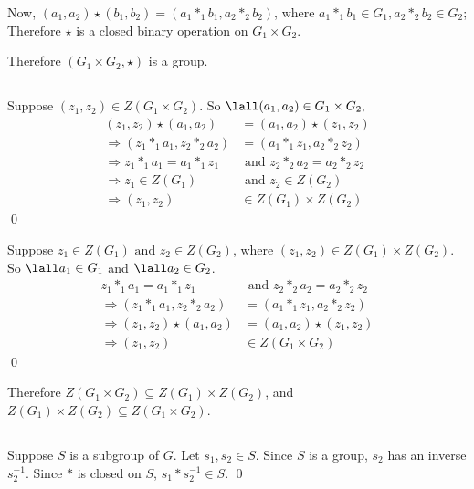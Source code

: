         Now, $(a_1, a_2) \star (b_1, b_2) = (a_1 *_1 b_1, a_2 *_2 b_2)$,
        where $a_1 *_1 b_1 \in G_1, a_2 *_2 b_2 \in G_2$;\\
        Therefore $\star$ is a closed binary operation on $G_1 \times G_2$.

        Therefore $(G_1\times G_2, \star)$ is a group.

    \subsection{
        }
        Suppose $(z_1, z_2) \in Z(G_1 \times G_2)$.
        So $\lall (a_1, a_2) \in G_1 \times G_2,$
        \begin{align*}
            (z_1 , z_2) \star (a_1,a_2) &= (a_1,a_2) \star (z_1, z_2) \\
            \Rightarrow (z_1 *_1 a_1, z_2 *_2 a_2) &= (a_1 *_1 z_1, a_2 *_2 z_2) \\
            \Rightarrow z_1 *_1 a_1 = a_1 *_1 z_1 &\text{ and } z_2 *_2 a_2 = a_2 *_2 z_2 \\
            \Rightarrow z_1 \in Z(G_1) &\text{ and } z_2 \in Z(G_2) \\
            \Rightarrow (z_1, z_2) &\in Z(G_1) \times Z(G_2)
        \end{align*} 
        \qed

        Suppose $z_1 \in Z(G_1) \text{ and } z_2 \in Z(G_2)$, 
        where $(z_1, z_2) \in Z(G_1) \times Z(G_2)$.
        So $\lall a_1 \in G_1$ and $\lall a_2 \in G_2$.
        \begin{align*}
            z_1 *_1 a_1 = a_1 *_1 z_1 &\text{ and } z_2 *_2 a_2 = a_2 *_2 z_2 \\
            \Rightarrow (z_1 *_1 a_1, z_2 *_2 a_2) &= (a_1 *_1 z_1, a_2 *_2 z_2) \\
            \Rightarrow (z_1 , z_2) \star (a_1,a_2) &= (a_1,a_2) \star (z_1, z_2) \\
            \Rightarrow (z_1, z_2) &\in Z(G_1 \times G_2)
        \end{align*} 
        \qed
        
        Therefore $Z(G_1 \times G_2) \subseteq Z(G_1) \times Z(G_2)$,
        and $Z(G_1) \times Z(G_2) \subseteq Z(G_1 \times G_2)$.

    \newpage
    \subsection{
        }
        Suppose $S$ is a subgroup of $G$.
        Let $s_1, s_2 \in S$.
        Since $S$ is a group, $s_2$ has an inverse $s_2^{-1}$.
        Since $*$ is closed on $S$, $s_1 * s_2^{-1} \in S$.
        \qed

